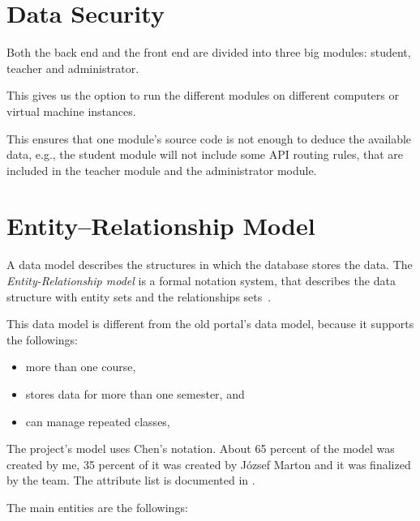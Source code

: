  
 \section{Data Security}
 Both the back end and the front end are divided into three big modules: student, teacher and administrator. 

 This gives us the option to run the different modules on different computers or virtual machine instances.
 
 This ensures that one module's source code is not enough to deduce the available data, e.g., the student module will not include some API routing rules, that are included in the teacher module and the administrator module.
 

\section{Entity–Relationship Model}
\label{ER-model}

A data model describes the structures in which the database stores the data. The \emph{Entity-Relationship model} is a formal notation system, that describes the data structure with entity sets and the relationships sets~\cite{adatb}.

This data model is different from the old portal's data model, because it supports the followings:

\begin{itemize}
	\item more than one course,
	\item stores data for more than one semester, and
	\item can manage repeated classes,
\end{itemize}
 
The project's model uses Chen's notation. About 65 percent of the model was created by me, 35 percent of it was created by József Marton and it was finalized by the team. The attribute list is documented in .

The main entities are the followings:

